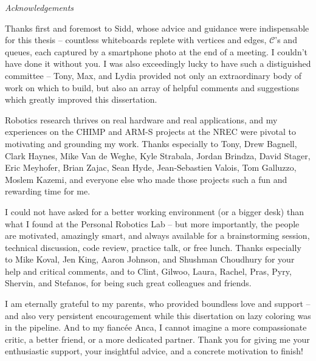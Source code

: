 
\begin{fullwidth}
\begin{adjustwidth}{1in}{1in}

{\LARGE \emph{Acknowledgements}}

\vspace{0.2in}

Thanks first and foremost to Sidd,
whose advice and guidance were indispensable for
this thesis
-- countless whiteboards replete with
vertices and edges, $\mathcal{C}$'s and queues,
each captured by a smartphone photo at the end of a meeting.
I couldn't have done it without you.
I was also exceedingly lucky to have such a distiguished
committee --
Tony, Max, and Lydia provided not only an extraordinary body of work
on which to build,
but also an array of helpful comments and suggestions which greatly
improved this dissertation.

Robotics research thrives on real hardware and real applications,
and my experiences on the CHIMP and ARM-S projects
at the NREC were pivotal to motivating and grounding my work.
Thanks especially to Tony, Drew Bagnell,
Clark Haynes, Mike Van de Weghe, Kyle Strabala, Jordan Brindza,
David Stager, Eric Meyhofer, Brian Zajac, Sean Hyde,
Jean-Sebastien Valois, Tom Galluzzo, Moslem Kazemi,
and everyone else who made those projects such a fun and rewarding
time for me.

I could not have asked for a better working environment
(or a bigger desk)
than what I found at the Personal Robotics Lab
-- but more importantly,
the people are motivated, amazingly smart, and always available
for a brainstorming session, technical discussion, code review,
practice talk, or free lunch.
Thanks especially to Mike Koval, Jen King, Aaron Johnson,
and Shushman Choudhury for your help and critical comments,
and to Clint, Gilwoo, Laura, Rachel, Pras, Pyry, Shervin, and Stefanos,
for being such great colleagues and friends.

I am eternally grateful to my parents,
who provided boundless love and support
-- and also very persistent encouragement
while this disertation on lazy coloring was in the pipeline.
And to my fianc\'{e}e Anca,
I cannot imagine
a more compassionate critic,
a better friend,
or a more dedicated partner.
Thank you for giving me your enthusiastic support,
your insightful advice,
and a concrete motivation to finish!

\end{adjustwidth}
\end{fullwidth}
